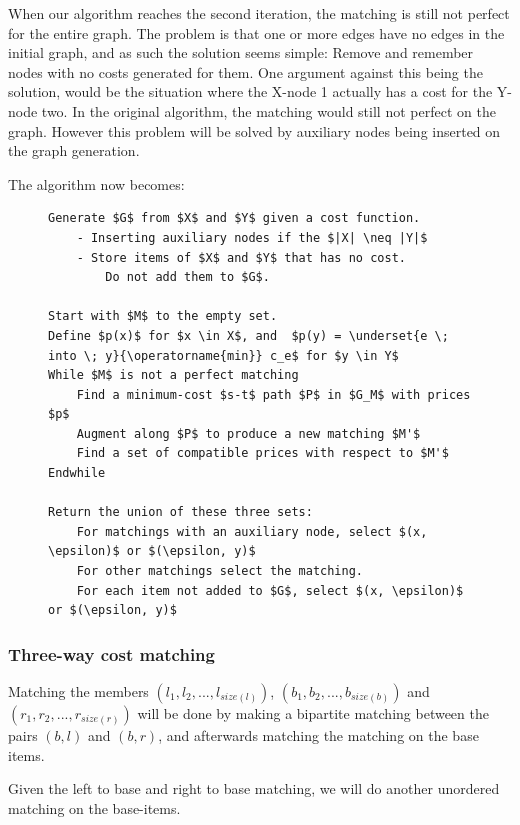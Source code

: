 \documentclass[11pt]{article}
\begin{document}
\endgroup

When our algorithm reaches the second iteration, the matching is still not perfect for the entire graph. The problem is that one or more edges have no edges in the initial graph, and as such the solution seems simple: Remove and remember nodes with no costs generated for them. One argument against this being the solution, would be the situation where the X-node 1 actually has a cost for the Y-node two. In the original algorithm, the matching would still not perfect on the graph. However this problem will be solved by auxiliary nodes being inserted on the graph generation.

The algorithm now becomes:

\begin{figure}
\begin{lstlisting}[mathescape]
Generate $G$ from $X$ and $Y$ given a cost function.
	- Inserting auxiliary nodes if the $|X| \neq |Y|$
	- Store items of $X$ and $Y$ that has no cost.
	    Do not add them to $G$.
	    
Start with $M$ to the empty set.
Define $p(x)$ for $x \in X$, and  $p(y) = \underset{e \; into \; y}{\operatorname{min}} c_e$ for $y \in Y$
While $M$ is not a perfect matching
    Find a minimum-cost $s-t$ path $P$ in $G_M$ with prices $p$
    Augment along $P$ to produce a new matching $M'$
    Find a set of compatible prices with respect to $M'$
Endwhile

Return the union of these three sets:
    For matchings with an auxiliary node, select $(x, \epsilon)$ or $(\epsilon, y)$
    For other matchings select the matching.
    For each item not added to $G$, select $(x, \epsilon)$ or $(\epsilon, y)$

\end{lstlisting}
\end{figure}



\subsubsection{Three-way cost matching}
Matching the members $(l_1, l_2, ..., l_{size(l)})$, $(b_1, b_2, ..., b_{size(b)})$ and $(r_1, r_2, ..., r_{size(r)})$ will be done by making a bipartite matching between the pairs $(b, l)$ and $(b, r)$, and afterwards matching the matching on the base items.

Given the left to base and right to base matching, we will do another unordered matching on the base-items.
\end{document}

